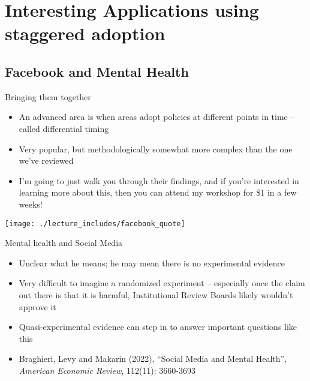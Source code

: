 \documentclass{beamer}
\begin{document}
\section{Interesting Applications using staggered adoption}

\subsection{Facebook and Mental Health}

\begin{frame}{Bringing them together}

\begin{itemize}

\item An advanced area is when areas adopt policies at different points in time -- called differential timing
\item Very popular, but methodologically somewhat more complex than the one we've reviewed
\item I'm going to just walk you through their findings, and if you're interested in learning more about this, then you can attend my workshop for \$1 in a few weeks!

\end{itemize}

\end{frame}


\begin{frame}
\begin{center}
\texttt{[image: ./lecture\_includes/facebook\_quote]}
\end{center}
\end{frame}



\begin{frame}{Mental health and Social Media}

\begin{itemize}
\item Unclear what he means; he may mean there is no experimental evidence
\item Very difficult to imagine a randomized experiment -- especially once the claim out there is that it is harmful, Institutional Review Boards likely wouldn't approve it
\item Quasi-experimental evidence can step in to answer important questions like this
\item Braghieri, Levy and Makarin (2022), ``Social Media and Mental Health'', \emph{American Economic Review}, 112(11): 3660-3693


\end{itemize}

\end{frame}
\end{document}
